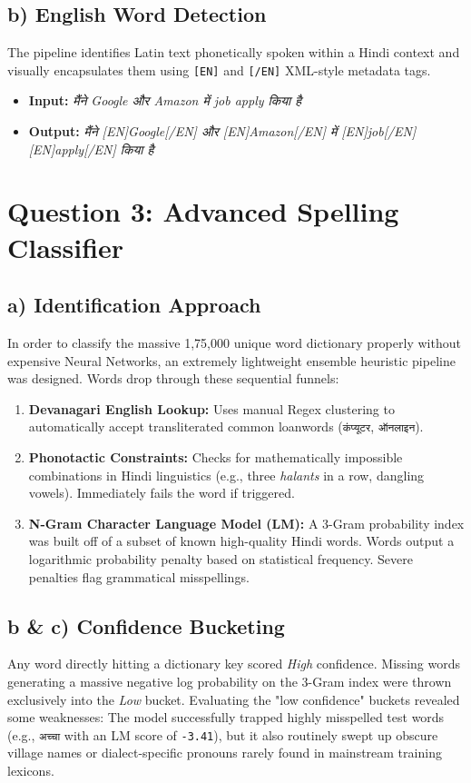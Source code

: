 \documentclass[11pt]{article}
\begin{document}
\subsection*{b) English Word Detection}
The pipeline identifies Latin text phonetically spoken within a Hindi context and visually encapsulates them using \texttt{[EN]} and \texttt{[/EN]} XML-style metadata tags. 
\begin{itemize}
    \item \textbf{Input:} \textsl{\texthindi{मैंने Google और Amazon में job apply किया है}}
    \item \textbf{Output:} \textsl{\texthindi{मैंने [EN]Google[/EN] और [EN]Amazon[/EN] में [EN]job[/EN] [EN]apply[/EN] किया है}}
\end{itemize}


\section*{Question 3: Advanced Spelling Classifier}
\subsection*{a) Identification Approach}
In order to classify the massive 1,75,000 unique word dictionary properly without expensive Neural Networks, an extremely lightweight ensemble heuristic pipeline was designed. Words drop through these sequential funnels:
\begin{enumerate}[noitemsep]
    \item \textbf{Devanagari English Lookup:} Uses manual Regex clustering to automatically accept transliterated common loanwords (\texttt{\texthindi{कंप्यूटर}}, \texttt{\texthindi{ऑनलाइन}}).
    \item \textbf{Phonotactic Constraints:} Checks for mathematically impossible combinations in Hindi linguistics (e.g., three \textsl{halants} in a row, dangling vowels). Immediately fails the word if triggered.
    \item \textbf{N-Gram Character Language Model (LM):} A 3-Gram probability index was built off of a subset of known high-quality Hindi words. Words output a logarithmic probability penalty based on statistical frequency. Severe penalties flag grammatical misspellings.
\end{enumerate}

\subsection*{b \& c) Confidence Bucketing}
Any word directly hitting a dictionary key scored \textit{High} confidence. Missing words generating a massive negative log probability on the 3-Gram index were thrown exclusively into the \textit{Low} bucket.
Evaluating the "low confidence" buckets revealed some weaknesses: The model successfully trapped highly misspelled test words (e.g., \texttt{\texthindi{अच्चा}} with an LM score of \texttt{-3.41}), but it also routinely swept up obscure village names or dialect-specific pronouns rarely found in mainstream training lexicons.
\end{document}
